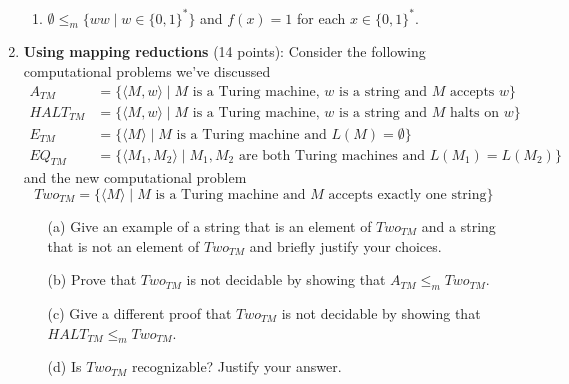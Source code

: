 \begin{enumerate}[wide, labelwidth=!, labelindent=0pt]
\begin{enumerate}
\item\gradeCorrect $\emptyset \le_m \{w w \mid w \in \{0,1\}^* \}$ and
$f(x) = 1$ for each $x \in \{0,1\}^*$.


\end{enumerate}

\item\textbf{Using mapping reductions} (14 points):
Consider the following computational problems we've discussed
\begin{align*}
A_{TM} &= \{ \langle M, w \rangle \mid M \text{ is a Turing machine, } w \text{ is a string and $M$ accepts $w$}\} \\
HALT_{TM} &= \{ \langle M, w \rangle \mid M \text{ is a Turing machine, } w \text{ is a string and $M$ halts on $w$}\} \\
E_{TM} &=  \{ \langle M \rangle \mid M \text{ is a Turing machine and } L(M) = \emptyset\} \\
EQ_{TM} &= \{ \langle M_1, M_2 \rangle \mid M_1, M_2 \text{ are both Turing machines and } L(M_1) = L(M_2) \}
\end{align*}
and the new computational problem
\[
    Two_{TM} = \{ \langle M \rangle \mid M \text{ is a Turing machine and $M$ accepts exactly one string} \}
\]

\begin{enumerate}
\item[(a)] \gradeCorrect Give an example of a string that is an element of $Two_{TM}$ and a string that is not an element of
$Two_{TM}$ and briefly justify your choices.
\item[(b)] \gradeComplete Prove that $Two_{TM}$ is not decidable by showing that $A_{TM} \leq_m Two_{TM}$.
\item[(c)] \gradeCorrect Give a different proof that $Two_{TM}$ is not decidable by showing that $HALT_{TM} \leq_m Two_{TM}$.
\item[(d)] \gradeComplete Is $Two_{TM}$ recognizable? Justify your answer.
\end{enumerate}


\end{enumerate}
